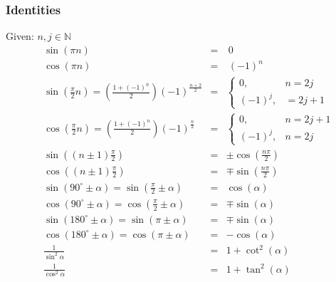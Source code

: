 \subsubsection{Identities}
Given: $n, j \in \mathbb{N}$
\begin{align*}
     & \sin(\pi n)                                                                      & = & \: 0                                                    \\
     & \cos(\pi n)                                                                      & = & \: {(-1)}^n                                             \\
     & \sin(\frac{\pi}{2}n) = \left(\frac{1 + {(-1)}^n}{2}\right){(-1)}^{\frac{n+2}{2}} & = & \begin{cases} 0, &n=2j \\ {(-1)}^j,&=2j+1 \end{cases}   \\
     & \cos(\frac{\pi}{2}n) = \left(\frac{1+{(-1)}^n}{2}\right){(-1)}^{\frac{n}{2}}     & = & \begin{cases} 0, &n=2j+1 \\ {(-1)}^j, &n=2j \end{cases} \\
     & \sin\left(\left(n\pm 1\right)\frac{\pi}{2}\right)                                & = & \pm \cos\left(\frac{n\pi}{2}\right)                     \\
     & \cos\left(\left(n\pm 1\right)\frac{\pi}{2}\right)                                & = & \mp \sin\left(\frac{n\pi}{2}\right)                     \\
     & \sin(90^\circ\pm\alpha) = \sin(\frac{\pi}{2} \pm \alpha)                         & = & \cos(\alpha)                                            \\
     & \cos(90^\circ\pm\alpha) = \cos(\frac{\pi}{2} \pm \alpha)                         & = & \mp\sin(\alpha)                                         \\
     & \sin(180^\circ\pm\alpha) = \sin(\pi \pm \alpha)                                  & = & \mp\sin(\alpha)                                         \\
     & \cos(180^\circ\pm\alpha) = \cos(\pi \pm \alpha)                                  & = & -\cos(\alpha)                                           \\
     & \frac{1}{\sin^2 \alpha}                                                          & = & 1+\cot^2 (\alpha)                                       \\
     & \frac{1}{\cos^2 \alpha}                                                          & = & 1+\tan^2 (\alpha)
\end{align*}

